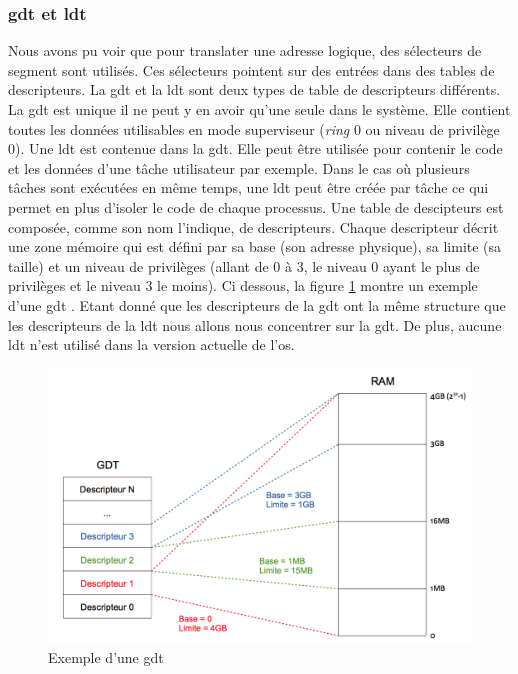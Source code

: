 \subsubsection{\acrshort{gdt} et \acrshort{ldt}}
\label{gdt_ldt}
Nous avons pu voir que pour translater une adresse logique, des sélecteurs de
segment sont utilisés. Ces sélecteurs pointent sur des entrées dans des tables
de descripteurs. La \acrshort{gdt} et la \acrshort{ldt} sont deux types de table 
de descripteurs différents. La \acrshort{gdt} est unique il ne peut y en avoir
qu'une seule dans le système. Elle contient toutes les données utilisables en mode
superviseur (\textit{ring} 0 ou niveau de privilège 0). Une \acrshort{ldt} est
contenue dans la \acrshort{gdt}. Elle peut être utilisée pour contenir le code
et les données d'une tâche utilisateur par exemple. Dans le cas où plusieurs tâches
sont exécutées en même temps, une \acrshort{ldt} peut être créée par tâche ce qui
permet en plus d'isoler le code de chaque processus. Une table de descipteurs
est composée, comme son nom l'indique, de descripteurs. Chaque descripteur décrit
une zone mémoire qui est défini par sa base (son adresse physique), sa limite (sa taille)
et un niveau de privilèges (allant de 0 à 3, le niveau 0 ayant le plus de privilèges
et le niveau 3 le moins). Ci dessous, la figure \ref{gdt} montre un exemple d'une
\acrshort{gdt} \cite{ref42}. Etant donné que les descripteurs de la \acrshort{gdt}
ont la même structure que les descripteurs de la \acrshort{ldt} nous allons nous
concentrer sur la \acrshort{gdt}. De plus, aucune \acrshort{ldt} n'est utilisé dans
la version actuelle de l'\acrshort{os}. \\

\begin{figure}[!h]
  \centering
  \includegraphics[scale=0.75]{images/gdt.png}
  \caption{Exemple d'une \acrshort{gdt}}
  \label{gdt}
\end{figure}

